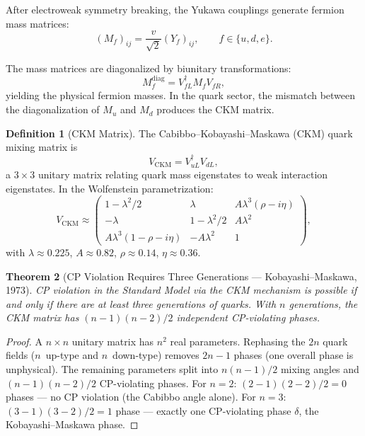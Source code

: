 \documentclass[12pt]{article}
\newtheorem{theorem}{Theorem}[section]
\theoremstyle{definition}
\newtheorem{definition}[theorem]{Definition}
\theoremstyle{remark}
\begin{document}
After electroweak symmetry breaking, the Yukawa couplings generate fermion mass matrices:
\begin{equation}
\label{eq:fermion-masses}
(M_f)_{ij} = \frac{v}{\sqrt{2}} (Y_f)_{ij}, \qquad f \in \{u, d, e\}.
\end{equation}

The mass matrices are diagonalized by biunitary transformations:
\begin{equation}
M_f^{\text{diag}} = V_{fL}^\dagger M_f V_{fR},
\end{equation}
yielding the physical fermion masses. In the quark sector, the mismatch between the diagonalization of $M_u$ and $M_d$ produces the CKM matrix.

\begin{definition}[CKM Matrix]
\label{def:ckm}
The Cabibbo--Kobayashi--Maskawa (CKM) quark mixing matrix is
\begin{equation}
\label{eq:ckm}
V_{\mathrm{CKM}} = V_{uL}^\dagger V_{dL},
\end{equation}
a $3 \times 3$ unitary matrix relating quark mass eigenstates to weak interaction eigenstates. In the Wolfenstein parametrization:
\begin{equation}
\label{eq:wolfenstein}
V_{\mathrm{CKM}} \approx \begin{pmatrix}
1 - \lambda^2/2 & \lambda & A\lambda^3(\rho - i\eta) \\
-\lambda & 1 - \lambda^2/2 & A\lambda^2 \\
A\lambda^3(1 - \rho - i\eta) & -A\lambda^2 & 1
\end{pmatrix},
\end{equation}
with $\lambda \approx 0.225$, $A \approx 0.82$, $\rho \approx 0.14$, $\eta \approx 0.36$.
\end{definition}

\begin{theorem}[CP Violation Requires Three Generations --- Kobayashi--Maskawa, 1973]
\label{thm:cp-violation-ckm}
CP violation in the Standard Model via the CKM mechanism is possible if and only if there are at least three generations of quarks. With $n$ generations, the CKM matrix has $(n-1)(n-2)/2$ independent CP-violating phases.
\end{theorem}

\begin{proof}
A $n \times n$ unitary matrix has $n^2$ real parameters. Rephasing the $2n$ quark fields ($n$~up-type and $n$~down-type) removes $2n - 1$ phases (one overall phase is unphysical). The remaining parameters split into $n(n-1)/2$ mixing angles and $(n-1)(n-2)/2$ CP-violating phases. For $n = 2$: $(2-1)(2-2)/2 = 0$ phases --- no CP violation (the Cabibbo angle alone). For $n = 3$: $(3-1)(3-2)/2 = 1$ phase --- exactly one CP-violating phase $\delta$, the Kobayashi--Maskawa phase.
\end{proof}
\end{document}
